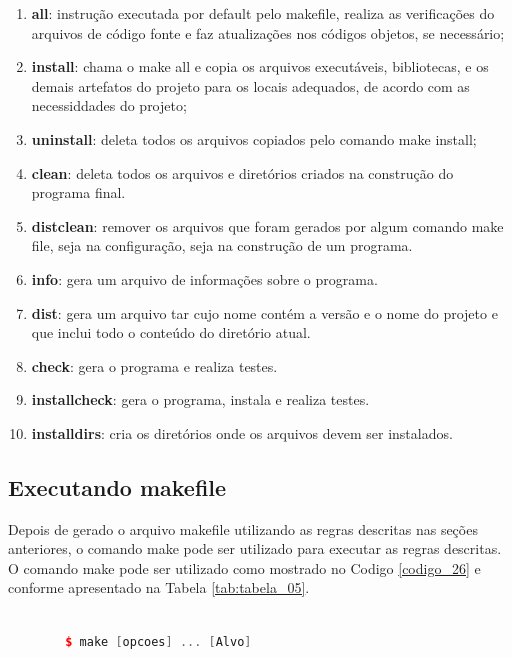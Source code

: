 \begin{enumerate}
    \item \textbf{all}: instrução executada por default pelo makefile, 
realiza as verificações do arquivos de código fonte e faz atualizações
 nos códigos objetos, se necessário;
    \item \textbf{install}: chama o make all e copia os arquivos 
executáveis, bibliotecas, e os demais artefatos do projeto para os 
locais adequados, de acordo com as necessiddades do projeto;
    \item \textbf{uninstall}: deleta todos os arquivos copiados 
pelo comando make install;
    \item \textbf{clean}: deleta todos os arquivos e diretórios 
criados na construção do programa final.
    \item \textbf{distclean}: remover os arquivos que foram gerados
 por algum comando make file, seja na configuração, seja na
 construção de um programa.
    \item \textbf{info}: gera um arquivo de informações sobre o programa.
    \item \textbf{dist}: gera um arquivo tar cujo nome contém a versão e
o nome do projeto e  que inclui  todo o conteúdo do diretório atual.
    \item \textbf{check}: gera o programa  e realiza testes. 
    \item \textbf{installcheck}: gera o programa, instala e realiza testes.
    \item \textbf{installdirs}: cria  os diretórios onde os arquivos devem ser instalados.
\end{enumerate}


\subsection{Executando makefile}

Depois de gerado o arquivo makefile utilizando as regras descritas nas seções anteriores,
 o comando make pode ser utilizado para executar as regras descritas.
O comando make pode ser utilizado como mostrado no Codigo \ref{codigo_26} e conforme apresentado na Tabela \ref{tab:tabela_05}.


    \begin{lstlisting}[language=C++,frame=single,captionpos=b,caption={ 
                                     Definição de variavel e utilização},
                                                         label=codigo_26]
    
        $ make [opcoes] ... [Alvo]

    \end{lstlisting}



